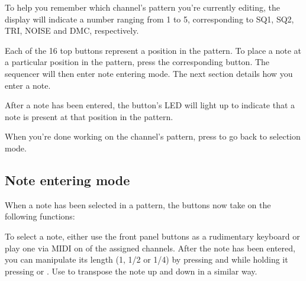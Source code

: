 \documentclass[a4paper, 12p, titlepaget]{book}
\newcommand {\btn}[1] {\framebox{\textbf{\footnotesize #1}}}
\begin{document}
To help you remember which channel's pattern you're currently editing, the display will indicate a number ranging from 1 to 5, corresponding to SQ1, SQ2, TRI, NOISE and DMC, respectively. 

Each of the 16 top buttons represent a position in the pattern. To place a note at a particular position in the pattern, press the corresponding button. The sequencer will then enter note entering mode. The next section details how you enter a note.

After a note has been entered, the button's LED will light up to indicate that a note is present at that position in the pattern.

When you're done working on the channel's pattern, press \btn{BACK} to go back to selection mode.

\subsection{Note entering mode}

When a note has been selected in a pattern, the buttons now take on the following functions:


To select a note, either use the front panel buttons as a rudimentary keyboard or play one via MIDI on of the assigned channels. After the note has been entered, you can manipulate its length (1, 1/2 or 1/4) by pressing \btn{LENGTH} and while holding it pressing \btn{UP} or \btn{DOWN}. Use \btn{OCTAVE} to transpose the note up and down in a similar way.
\end{document}
